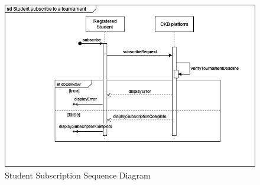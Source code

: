 \begin{center}
    \begin{figure} [H]
        \begin{center}
            \includegraphics[width=0.9\linewidth]{Images/SequenceDiagrams/SD_3.png}
            \caption{Student Subscription Sequence Diagram}
            \label{fig: student_subscription_seq_diag}
        \end{center}
    \end{figure}
\end{center}

